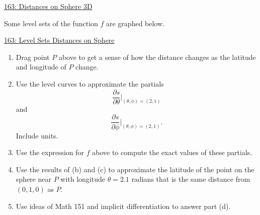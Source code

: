 \documentclass{ximera}
\begin{document}
\begin{onlineOnly}
    \begin{center}
\end{center}
\end{onlineOnly}

\href{https://www.desmos.com/3d/diqbhi8jch}{163: Distances on Sphere 3D}

Some level sets of the function $f$ are graphed below.

\begin{onlineOnly}
    \begin{center}
\end{center}
\end{onlineOnly}

\href{https://www.desmos.com/calculator/njngjntwn0}{163: Level Sets Distances on Sphere}


\begin{enumerate}
\item Drag point $P$ above to get a sense of how the distance changes as the latitude and longitude of $P$ change.

\item Use the level curves to approximate the partials
\[
    \frac{\partial s}{\partial \theta} \Big|_{(\theta, \phi)=(2,1)}
\]
and
\[
     \frac{\partial s}{\partial \phi} \Big|_{(\theta, \phi)=(2,1)} .
\]
Include units.

\item Use the expression for $f$ above to compute the exact values of these partials.

\item Use the results of (b) and (c) to approximate the latitude of the point on the sphere near $P$ with longitude $\theta=2.1$ radians that is the same distance from $(0,1,0)$ as $P$.

\item Use ideas of Math 151 and implicit differentiation to answer part (d).



\end{enumerate}
\end{document}
